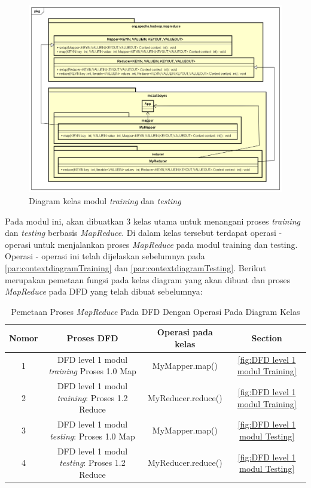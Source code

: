 \begin{figure}[H]
	\centering
	\includegraphics[scale=0.54]{ClassDiagram/Class_Diagram_Train_Test_MR}
	\caption[Diagram kelas modul \textit{training} dan \textit{testing}]{Diagram kelas modul \textit{training} dan \textit{testing}}
	\label{fig:Diagram kelas modul training dan testing}
\end{figure}

Pada modul ini, akan dibuatkan 3 kelas utama untuk menangani proses \textit{training} dan \textit{testing} berbasis \textit{MapReduce}. Di dalam kelas tersebut terdapat operasi - operasi untuk menjalankan proses \textit{MapReduce} pada modul training dan testing. Operasi - operasi ini telah dijelaskan sebelumnya pada \ref{par:contextdiagramTraining} dan \ref{par:contextdiagramTesting}. Berikut merupakan pemetaan fungsi pada kelas diagram yang akan dibuat dan proses \textit{MapReduce} pada DFD yang telah dibuat sebelumnya:

\begin{table}[H]
	\label{tab:mapDFDProcesstoClassDiagramFunction}
	\centering
	\caption{Pemetaan Proses \textit{MapReduce} Pada DFD Dengan Operasi Pada Diagram Kelas}
	\begin{tabular}{ | c | c | c | c | }
	\hline
	Nomor & Proses DFD & Operasi pada kelas & Section\\ \hline \hline
	1 & DFD level 1 modul \textit{training} Proses 1.0 Map & MyMapper.map() & \ref{fig:DFD level 1 modul Training} \\ \hline
	2 & DFD level 1 modul \textit{training}: Proses 1.2 Reduce & MyReducer.reduce() & \ref{fig:DFD level 1 modul Training} \\ \hline
	3 & DFD level 1 modul \textit{testing}: Proses 1.0 Map & MyMapper.map() & \ref{fig:DFD level 1 modul Testing} \\ \hline
	4 & DFD level 1 modul \textit{testing}: Proses 1.2 Reduce & MyReducer.reduce() & \ref{fig:DFD level 1 modul Testing} \\ \hline
	\end{tabular}
\end{table}

